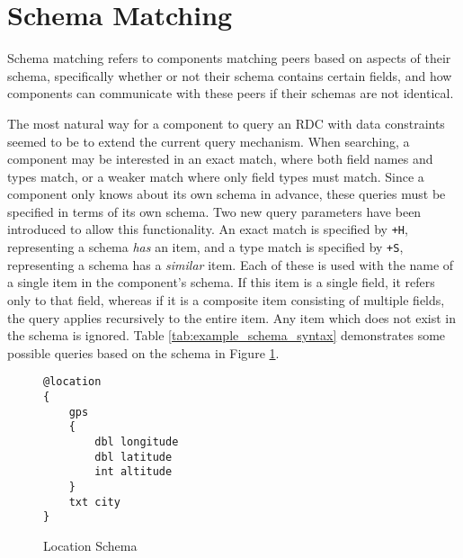 \documentclass[12pt,twoside,notitlepage]{report}
\begin{document}
\section{Schema Matching}

Schema matching refers to components matching peers based on aspects of their schema, specifically whether or not their schema contains certain fields, and how components can communicate with these peers if their schemas are not identical. 

The most natural way for a component to query an RDC with data constraints seemed to be to extend the current query mechanism. 
When searching, a component may be interested in an exact match, where both field names and types match, or a weaker match where only field types must match. 
Since a component only knows about its own schema in advance, these queries must be specified in terms of its own schema.
Two new query parameters have been introduced to allow this functionality. 
An exact match is specified by {\tt +H}, representing a schema {\sl has} an item, and a type match is specified by {\tt +S}, representing a schema has a {\sl similar} item.
Each of these is used with the name of a single item in the component's schema.
If this item is a single field, it refers only to that field, whereas if it is a composite item consisting of multiple fields, the query applies recursively to the entire item. 
Any item which does not exist in the schema is ignored. 
Table \ref{tab:example_schema_syntax} demonstrates some possible queries based on the schema in Figure \ref{fig:locationschema}.

\begin{figure}
\begin{lstlisting}
@location
{
	gps
	{
		dbl longitude
		dbl latitude
		int altitude
	}
	txt city
}
\end{lstlisting}
\caption{Location Schema}
\label{fig:locationschema}
\end{figure}
\end{document}
